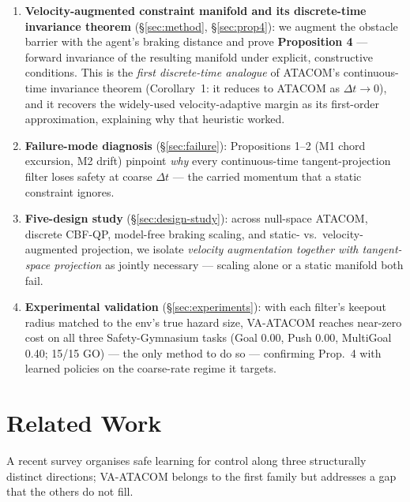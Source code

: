 \documentclass[letterpaper]{article}
\begin{document}
\begin{enumerate}
\item \textbf{Velocity-augmented constraint manifold and its discrete-time invariance theorem} (\S\ref{sec:method}, \S\ref{sec:prop4}): we augment the obstacle barrier with the agent's braking distance and prove \textbf{Proposition 4} --- forward invariance of the resulting manifold under explicit, constructive conditions. This is the \emph{first discrete-time analogue} of ATACOM's continuous-time invariance theorem (Corollary~1: it reduces to ATACOM as $\Delta t\to0$), and it recovers the widely-used velocity-adaptive margin as its first-order approximation, explaining why that heuristic worked.

\item \textbf{Failure-mode diagnosis} (\S\ref{sec:failure}): Propositions 1--2 (M1 chord excursion, M2 drift) pinpoint \emph{why} every continuous-time tangent-projection filter loses safety at coarse $\Delta t$ --- the carried momentum that a static constraint ignores.

\item \textbf{Five-design study} (\S\ref{sec:design-study}): across null-space ATACOM, discrete CBF-QP, model-free braking scaling, and static- vs.\ velocity-augmented projection, we isolate \emph{velocity augmentation together with tangent-space projection} as jointly necessary --- scaling alone or a static manifold both fail.

\item \textbf{Experimental validation} (\S\ref{sec:experiments}): with each filter's keepout radius matched to the env's true hazard size, VA-ATACOM reaches near-zero cost on all three Safety-Gymnasium tasks (Goal 0.00, Push 0.00, MultiGoal 0.40; 15/15 GO) --- the only method to do so --- confirming Prop.~4 with learned policies on the coarse-rate regime it targets.
\end{enumerate}

\section{Related Work}

A recent survey \cite{brunke2022} organises safe learning for control along three structurally distinct directions; VA-ATACOM belongs to the first family but addresses a gap that the others do not fill.
\end{document}
